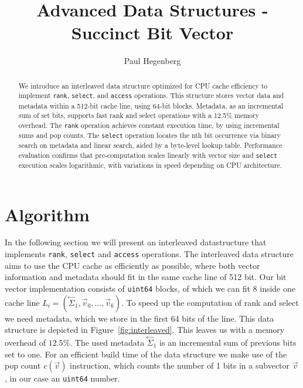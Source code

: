 \documentclass[a4paper,UKenglish,cleveref, autoref, thm-restate]{lipics-v2021}
\title{Advanced Data Structures - Succinct Bit Vector}
\author{Paul Hegenberg}{Karlsruher Institut für Technologie, Germany \and \url{https://blog.hegenberg.dev} }{urlgh@student.kit.edu}{}{}%
\def\code#1{\texttt{#1}}
\newcommand\prevsum[0]{\ensuremath{\overset{\leftarrow}{\Sigma}_1}}
\begin{document}
\maketitle

\begin{abstract}
We introduce an interleaved data structure optimized for CPU cache efficiency to implement \code{rank},
\code{select}, and \code{access} operations. This structure stores vector data and metadata within a
512-bit cache line, using 64-bit blocks. Metadata, as an incremental sum of set bits, supports fast 
rank and select operations with a 12.5\% memory overhead.
The \code{rank} operation achieves constant execution time, by using incremental sums and pop counts.
The \code{select} operation locates the nth bit occurrence via binary search on metadata and linear search,
aided by a byte-level lookup table.
Performance evaluation confirms that pre-computation scales linearly with vector size and \code{select}
execution scales logarithmic, with variations in speed depending on CPU architecture.
\end{abstract}

\section{Algorithm}
In the following section we will present an interleaved datastructure
that implements \code{rank}, \code{select} and \code{access} operations.
The interleaved data structure aims to use the CPU cache as efficiently as possible, where both
vector information and metadata should fit in the same cache line of 512 bit.
Our bit vector implementation consists of \code{uint64} blocks, of which we can fit 8 inside one cache line
$L_i = (\prevsum, \vec{v}_0, \dots, \vec{v}_6)$.
To speed up the computation of rank and select we need metadata, which we store in the first
64 bits of the line.
This data structure is depicted in Figure~\ref{fig:interleaved}. 
This leaves us with a memory overhead of $12.5\%$. The used metadata $\prevsum$ is an incremental sum of previous bits
set to one. For an efficient build time of the data structure we make use of the pop count $c(\vec{v})$
instruction, which counts the number of 1 bits in a subvector $\vec{v}$, in our case an \code{uint64} number.
\end{document}
